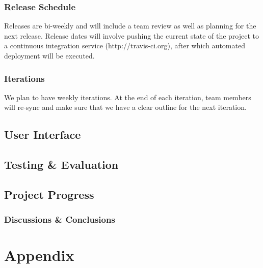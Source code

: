 \documentclass[11pt,letterpaper]{article}
\begin{document}
\subsubsection{Release Schedule}
Releases are bi-weekly and will include a team review as well as planning for the next release.
Release dates will involve pushing the current state of the project to a continuous integration service (http://travis-ci.org), after which automated deployment will be executed.

\subsubsection{Iterations}
We plan to have weekly iterations.
At the end of each iteration, team members will re-sync and make sure that we have a clear outline for the next iteration.

\subsection{User Interface}

\subsection{Testing \& Evaluation}

\subsection{Project Progress}

\subsubsection{Discussions \& Conclusions}

\section{Appendix}
\end{document}
